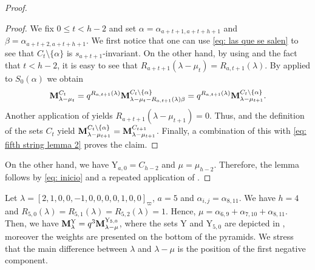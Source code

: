 \begin{proof}
\begin{proof}
We fix $0\leq t < h-2$ and set $\alpha = \alpha_{a+t+1,a+t+h+1} $ and $\beta=\alpha_{a+t+2,a+t+h+1}$.
We first notice that one can use \cref{eq: las que se salen} to see that $C_{t}\setminus \{\alpha \}$ is $s_{a+t+1}$-invariant.
On the other hand,  by using  and the fact that $t<h-2$, it is easy to see that $R_{a+t+1}(\lambda -\mu_t) = R_{a,t+1}(\lambda) $. 
By  applied to $S_0(\alpha)$ we obtain 
\begin{equation}\label{eq: fifth string lemma 2}
\mathbf{M}_{\lambda - \mu_{t}}^{C_{t}} = q^{R_{a,t+1}(\lambda )} \mathbf{M}_{\lambda - \mu_{t} - R_{a,t+1}(\lambda) \beta }^{C_{t} \setminus \{\alpha\}} = q^{R_{a,t+1}(\lambda )} \mathbf{M}_{\lambda - \mu_{t+1}}^{C_{t} \setminus \{\alpha\}}.
\end{equation}
Another application of  yields $R_{a+t+1}(\lambda-\mu_{t+1})=0 $. 
Thus,  and the definition of the sets $C_t$ yield 
$\mathbf{M}_{\lambda - \mu_{t+1}}^{C_{t} \setminus \{\alpha\} }=\mathbf{M}_{\lambda - \mu_{t+1}}^{C_{t+1}}  $. 
Finally, a combination of this with \cref{eq: fifth string lemma 2} proves the claim.
\end{proof}
On the other hand, we have  $\mathrm{Y}_{a,0}=C_{h-2}$ and $\mu = \mu_{h-2}$. 
Therefore, the lemma follows by \eqref{eq: inicio} and a repeated application of .
\end{proof}



\begin{example}\rm
Let $\lambda = [2,1,0,0,-1,0,0,0,0,1,0,0]_\varpi$, $a=5$ and $\alpha_{i,j} = \alpha_{8,11}$.
We have $h=4$ and $R_{5,0}(\lambda) =R_{5,1}(\lambda) =R_{5,2} (\lambda)= 1$.
Hence, $\mu = \alpha_{6,9} + \alpha_{7,10} + \alpha_{8,11}$.
Then, we have $\mathbf{M}_{\lambda}^{\mathrm{Y}} = q^{3}\mathbf{M}_{\lambda - \mu}^{\mathrm{Y}_{5,0}}$, where the sets $\mathrm{Y}$ and $\mathrm{Y}_{5,0}$ are depicted in , moreover the weights are presented on the bottom of the pyramids.
We stress that the main difference between $\lambda$ and $\lambda - \mu$ is the position of the first negative component. 
\end{example}

